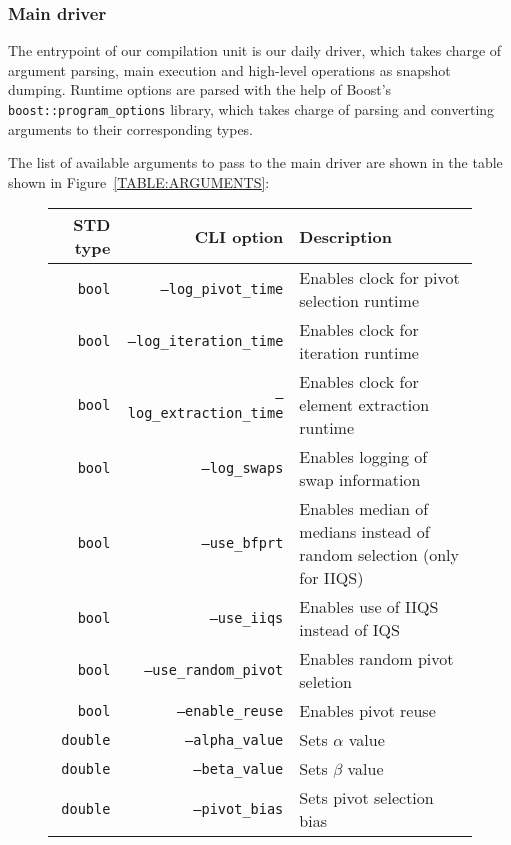 \subsubsection{Main driver}
The entrypoint of our compilation unit is our daily driver, which takes charge of argument parsing, main execution and high-level operations as snapshot dumping.  Runtime options are parsed with the help of Boost's \texttt{boost::program\_options} library, which takes charge of parsing and converting arguments to their corresponding types. 

The list of available arguments to pass to the main driver are shown in the table shown in Figure~\ref{TABLE:ARGUMENTS}:


\begin{figure}[!ht]
    \centering

    \begin{tabularx}{\linewidth}{|r|r|X|}
        \hline
        STD type & CLI option & Description \\
        \hline
        \texttt{bool} & \texttt{--log\_pivot\_time} & Enables clock for pivot selection runtime\\
        \hline
        \texttt{bool} & \texttt{--log\_iteration\_time} & Enables clock for iteration runtime \\
        \hline
        \texttt{bool} & \texttt{--log\_extraction\_time} & Enables clock for element extraction runtime\\
        \hline
        \texttt{bool} & \texttt{--log\_swaps} & Enables logging of swap information \\
        \hline
        \texttt{bool} & \texttt{--use\_bfprt} & Enables median of medians instead of random selection (only for IIQS) \\
        \hline
        \texttt{bool} & \texttt{--use\_iiqs} & Enables use of IIQS instead of IQS \\
        \hline
        \texttt{bool} & \texttt{--use\_random\_pivot} & Enables random pivot seletion \\
        \hline
        \texttt{bool} & \texttt{--enable\_reuse} & Enables pivot reuse \\
        \hline
        \texttt{double} & \texttt{--alpha\_value} & Sets $\alpha$ value \\
        \hline
        \texttt{double} & \texttt{--beta\_value} & Sets $\beta$ value \\
        \hline
        \texttt{double} & \texttt{--pivot\_bias} & Sets pivot selection bias \\

\end{tabularx}
\end{figure}
